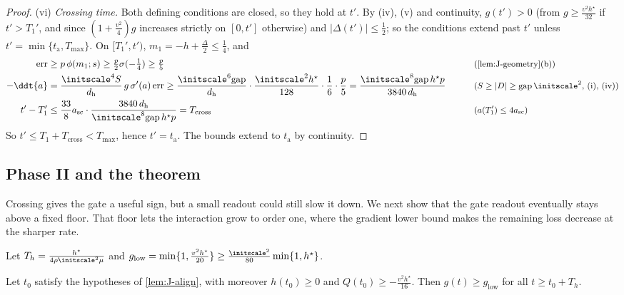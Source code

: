 \begin{proof}
\noindent(vi) \emph{Crossing time.} Both defining conditions are closed, so they hold at $t'$. By (iv), (v) and continuity, $g(t')>0$ (from
$g\ge\frac{v^2h^\star}{32}$ if $t'>T_1'$, and since $(1+\frac{v^2}{4})g$ increases strictly on $[0,t']$ otherwise) and $|\Delta(t')|\le\frac{1}{2}$; so the
conditions extend past $t'$ unless $t'=\min\{t_{\mathrm a},T_{\max}\}$. On $[T_1',t')$, $m_1=-h+\frac{\Delta}{2}\le\frac{1}{4}$, and
\begin{alignat*}{2}
 \mathrm{err}&\ge p\,\phi(m_1;s)\ge\tfrac{p}{2}\sigma(-\tfrac{1}{4})\ge\tfrac{p}{5} &\qquad& \why{\cref{lem:J-geometry}(b)}\\
 -\ddt{a}&=\frac{\initscale^4S}{d_{\mathrm h}}\,g\,\sigma'(a)\,\mathrm{err}\ge\frac{\initscale^6\mathrm{gap}}{d_{\mathrm h}}\cdot\frac{\initscale^2h^\star}{128}\cdot\frac{1}{6}\cdot\frac{p}{5}
 =\frac{\initscale^8\mathrm{gap}\,h^\star p}{3840\,d_{\mathrm h}} && \why{$S\ge|D|\ge\mathrm{gap}\,\initscale^2$, (i), (iv)}\\
 t'-T_1'&\le\frac{33}{8}a_{\mathrm{sc}}\cdot\frac{3840\,d_{\mathrm h}}{\initscale^8\mathrm{gap}\,h^\star p}=T_{\mathrm{cross}} && \why{$a(T_1')\le4a_{\mathrm{sc}}$}
\end{alignat*}
So $t'\le T_1+T_{\mathrm{cross}}<T_{\max}$, hence $t'=t_{\mathrm a}$. The bounds extend to $t_{\mathrm a}$ by continuity.
\end{proof}

\subsection{Phase II and the theorem}

Crossing gives the gate a useful sign, but a small readout could still slow it down. We next show that the gate readout eventually
stays above a fixed floor. That floor lets the interaction grow to order one, where the gradient lower bound makes the remaining
loss decrease at the sharper rate.

Let $T_h=\frac{h^\star}{4\rho\initscale^2\mu}$ and $g_{\mathrm{low}}=\min\{1,\frac{v^2h^\star}{20}\}\ge\frac{\initscale^2}{80}\min\{1,h^\star\}$.

\begin{lemma}
\label{lem:J-floor}
Let $t_0$ satisfy the hypotheses of \cref{lem:J-align}, with moreover $h(t_0)\ge0$ and $Q(t_0)\ge-\frac{v^2h^\star}{16}$. Then $g(t)\ge g_{\mathrm{low}}$ for all
$t\ge t_0+T_h$.
\end{lemma}

